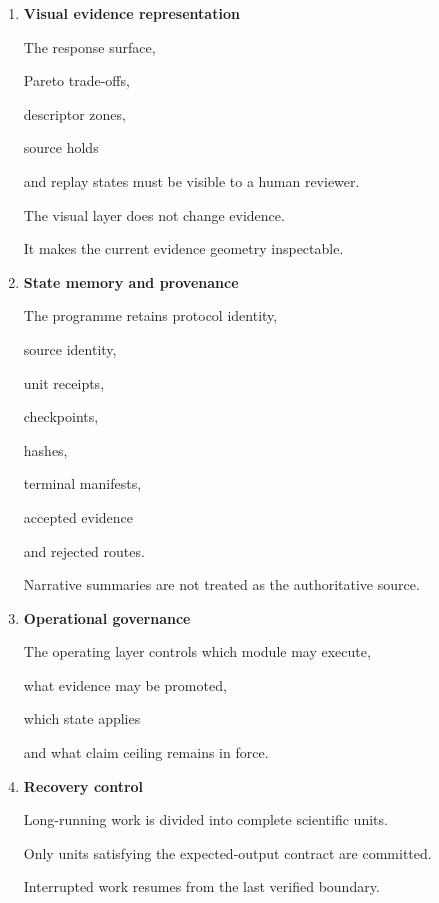 \documentclass[11pt,a4paper,oneside]{report}
\providecommand{\term}[1]{\textbf{#1}}
\begin{document}
\begin{enumerate}



\item

\term{Visual evidence representation}



The response surface,

Pareto trade-offs,

descriptor zones,

source holds

and replay states must be visible to a human reviewer.



The visual layer does not change evidence.



It makes the current evidence geometry inspectable.



\item

\term{State memory and provenance}



The programme retains protocol identity,

source identity,

unit receipts,

checkpoints,

hashes,

terminal manifests,

accepted evidence

and rejected routes.



Narrative summaries are not treated as the authoritative source.



\item

\term{Operational governance}



The operating layer controls which module may execute,

what evidence may be promoted,

which state applies

and what claim ceiling remains in force.



\item

\term{Recovery control}



Long-running work is divided into complete scientific units.



Only units satisfying the expected-output contract are committed.



Interrupted work resumes from the last verified boundary.



\end{enumerate}
\end{document}
